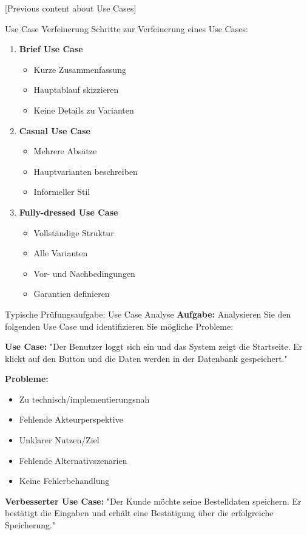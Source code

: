 [Previous content about Use Cases]

\begin{KR}{Use Case Verfeinerung}
Schritte zur Verfeinerung eines Use Cases:
\begin{enumerate}
    \item \textbf{Brief Use Case}
    \begin{itemize}
        \item Kurze Zusammenfassung
        \item Hauptablauf skizzieren
        \item Keine Details zu Varianten
    \end{itemize}
    \item \textbf{Casual Use Case}
    \begin{itemize}
        \item Mehrere Absätze
        \item Hauptvarianten beschreiben
        \item Informeller Stil
    \end{itemize}
    \item \textbf{Fully-dressed Use Case}
    \begin{itemize}
        \item Vollständige Struktur
        \item Alle Varianten
        \item Vor- und Nachbedingungen
        \item Garantien definieren
    \end{itemize}
\end{enumerate}
\end{KR}

\begin{example}{Typische Prüfungsaufgabe: Use Case Analyse}
\textbf{Aufgabe:} Analysieren Sie den folgenden Use Case und identifizieren Sie mögliche Probleme:

\textbf{Use Case:} "Der Benutzer loggt sich ein und das System zeigt die Startseite. Er klickt auf den Button und die Daten werden in der Datenbank gespeichert."

\textbf{Probleme:}
\begin{itemize}
    \item Zu technisch/implementierungsnah
    \item Fehlende Akteurperspektive
    \item Unklarer Nutzen/Ziel
    \item Fehlende Alternativszenarien
    \item Keine Fehlerbehandlung
\end{itemize}

\textbf{Verbesserter Use Case:}
"Der Kunde möchte seine Bestelldaten speichern. Er bestätigt die Eingaben und erhält eine Bestätigung über die erfolgreiche Speicherung."
\end{example}

